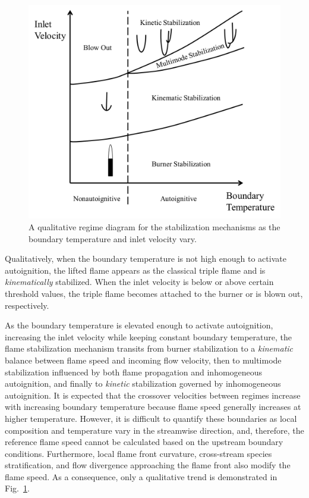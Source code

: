 \documentclass[review,3p,times]{elsarticle}
\begin{document}
\begin{figure}
  \centering
  \scriptsize
  \vspace{-0.1in}
  \includegraphics[width=1.0\textwidth]{2D-regime.png}
  \normalsize
  \vspace{-0.1in}
  \caption{A qualitative regime diagram for the stabilization mechanisms as the boundary temperature and inlet velocity vary. }
  \label{fig:2D-regime}
\end{figure}

Qualitatively, when the boundary temperature is not high enough to activate autoignition, the lifted flame appears as the classical triple flame and is \emph{kinematically} stabilized.  When the inlet velocity is below or above certain threshold values, the triple flame becomes attached to the burner or is blown out, respectively.  

As the boundary temperature is elevated enough to activate autoignition, increasing the inlet velocity while keeping constant boundary temperature, the flame stabilization mechanism transits from burner stabilization to a \emph{kinematic} balance between flame speed and incoming flow velocity, then to multimode stabilization influenced by both flame propagation and inhomogeneous autoignition, and finally to \emph {kinetic} stabilization governed by inhomogeneous autoignition.  It is expected that the crossover velocities between regimes increase with increasing boundary temperature because flame speed generally increases at higher temperature.  However, it is difficult to quantify these boundaries as local composition and temperature vary in the streamwise direction, and, therefore, the reference flame speed cannot be calculated based on the upstream boundary conditions.  Furthermore, local flame front curvature, cross-stream species stratification, and flow divergence approaching the flame front also modify the flame speed.  As a consequence, only a qualitative trend is demonstrated in Fig.~\ref{fig:2D-regime}.  
\end{document}
